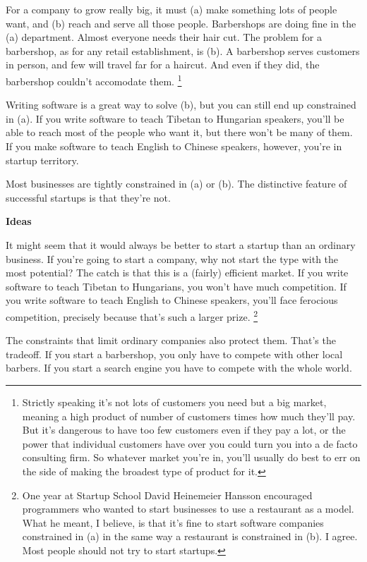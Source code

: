 For a company to grow really big, it must (a) make something lots of
people want, and (b) reach and serve all those people. Barbershops are
doing fine in the (a) department. Almost everyone needs their hair cut.
The problem for a barbershop, as for any retail establishment, is (b). A
barbershop serves customers in person, and few will travel far for a
haircut. And even if they did, the barbershop couldn't accomodate them.
\footnote{Strictly speaking it's not lots of customers you need but a big
market, meaning a high product of number of customers times how much
they'll pay. But it's dangerous to have too few customers even if they
pay a lot, or the power that individual customers have over you could
turn you into a de facto consulting firm. So whatever market you're in,
you'll usually do best to err on the side of making the broadest type of
product for it.}

Writing software is a great way to solve (b), but you can still end up
constrained in (a). If you write software to teach Tibetan to Hungarian
speakers, you'll be able to reach most of the people who want it, but
there won't be many of them. If you make software to teach English to
Chinese speakers, however, you're in startup territory.

Most businesses are tightly constrained in (a) or (b). The distinctive
feature of successful startups is that they're not.

\textbf{Ideas}

It might seem that it would always be better to start a startup than an
ordinary business. If you're going to start a company, why not start the
type with the most potential? The catch is that this is a (fairly)
efficient market. If you write software to teach Tibetan to Hungarians,
you won't have much competition. If you write software to teach English
to Chinese speakers, you'll face ferocious competition, precisely
because that's such a larger prize. \footnote{One year at Startup School David Heinemeier Hansson encouraged
programmers who wanted to start businesses to use a restaurant as a
model. What he meant, I believe, is that it's fine to start software
companies constrained in (a) in the same way a restaurant is constrained
in (b). I agree. Most people should not try to start startups.}

The constraints that limit ordinary companies also protect them. That's
the tradeoff. If you start a barbershop, you only have to compete with
other local barbers. If you start a search engine you have to compete
with the whole world.

